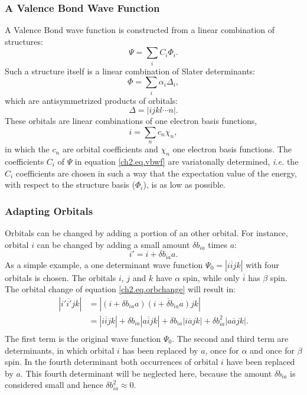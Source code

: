\subsubsection{A Valence Bond Wave Function}
 
A Valence Bond wave function is constructed from a linear combination of structures:
\begin{equation}
\Psi = \sum_{i} C_i \Phi_i.
\label{ch2.eq.vbwf}
\end{equation}
Such a structure itself is a linear combination of Slater determinants:
\begin{equation}
\Phi = \sum_{i} \alpha_i \Delta_i,
\label{ch2.eq.struct}
\end{equation}
which are antisymmetrized products of orbitals:
\begin{equation}
\Delta = |ijkl \cdots n|.
\label{ch2.eq.determ}
\end{equation}
These orbitals are linear combinations of one electron basis functions,
\begin{equation}
i = \sum_{n} c_n \chi_n,
\label{ch2.eq.basis}
\end{equation}
in which the $c_n$ are orbital coefficients and $\chi_n$ one electron basis functions. The coefficients $C_i$ of $\Psi$ in equation \ref{ch2.eq.vbwf} are variatonally determined, \textit{i.e.} the $C_i$ coefficients are chosen in such a way that the expectation value of the energy, with respect to the structure basis ($\Phi_i$), is as low as possible.

\subsubsection{Adapting Orbitals}

Orbitals can be changed by adding a portion of an other orbital. For instance, orbital $i$ can be changed by adding a small amount $\delta b_{ia}$ times $a$:
\begin{equation}
i' = i + \delta b_{ia} a.
\label{ch2.eq.orbchange}
\end{equation}
As a simple example, a one determinant wave function $\Psi_0=|i\overline{i}jk|$ with four orbitals is chosen. The orbitals $i$, $j$ and $k$ have $\alpha$ spin, while only $\overline{i}$ has $\beta$ spin. The orbital change of equation \ref{ch2.eq.orbchange} will result in:
\begin{equation}    
\begin{split}
|i'\overline{i'}jk | & = |(i + \delta b_{ia} a)\overline{(i + \delta b_{ia}a)}jk |\\
& = |i\overline{i}jk| + \delta b_{ia}|a\overline{i}jk| + \delta b_{ia} |i\overline{a}jk| + \delta b^2_{ia} |a\overline{a}jk|.\\
\end{split}
\label{ch2.eq.detchange}
\end{equation}
The first term is the original wave function $\Psi_0$. The second and third term are determinants, in which orbital $i$ has been replaced by $a$, once for $\alpha$ and once for $\beta$ spin. In the fourth determinant both occurrences of orbital $i$ have been replaced by $a$. This fourth determinant will be neglected here, because the amount $\delta b_{ia}$ is considered small and hence $\delta b_{ia}^2 \approx 0$.

